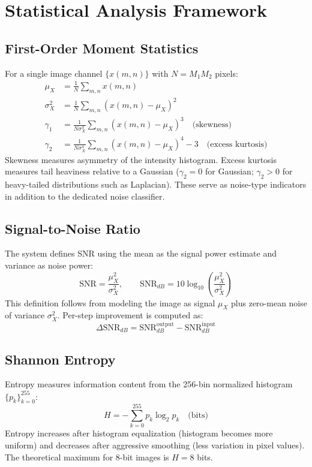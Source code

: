 \documentclass[10pt,conference]{IEEEtran}
\begin{document}
\section{Statistical Analysis Framework}

\subsection{First-Order Moment Statistics}
For a single image channel $\{x(m,n)\}$ with $N = M_1 M_2$ pixels:
\begin{align}
\mu_X &= \frac{1}{N}\sum_{m,n} x(m,n) \\
\sigma_X^2 &= \frac{1}{N}\sum_{m,n}(x(m,n)-\mu_X)^2 \\
\gamma_1 &= \frac{1}{N\sigma_X^3}\sum_{m,n}(x(m,n)-\mu_X)^3 \quad\text{(skewness)}\\
\gamma_2 &= \frac{1}{N\sigma_X^4}\sum_{m,n}(x(m,n)-\mu_X)^4 - 3 \quad\text{(excess kurtosis)}
\end{align}
Skewness measures asymmetry of the intensity histogram. Excess kurtosis measures tail heaviness relative to a Gaussian ($\gamma_2=0$ for Gaussian; $\gamma_2 > 0$ for heavy-tailed distributions such as Laplacian). These serve as noise-type indicators in addition to the dedicated noise classifier.

\subsection{Signal-to-Noise Ratio}
The system defines SNR using the mean as the signal power estimate and variance as noise power:
\begin{equation}
\text{SNR} = \frac{\mu_X^2}{\sigma_X^2}, \qquad \text{SNR}_{dB} = 10\log_{10}\!\left(\frac{\mu_X^2}{\sigma_X^2}\right)
\end{equation}
This definition follows from modeling the image as signal $\mu_X$ plus zero-mean noise of variance $\sigma_X^2$. Per-step improvement is computed as:
\begin{equation}
\Delta\text{SNR}_{dB} = \text{SNR}_{dB}^{\text{output}} - \text{SNR}_{dB}^{\text{input}}
\end{equation}

\subsection{Shannon Entropy}
Entropy measures information content from the 256-bin normalized histogram $\{p_k\}_{k=0}^{255}$:
\begin{equation}
H = -\sum_{k=0}^{255} p_k \log_2 p_k \quad \text{(bits)}
\end{equation}
Entropy increases after histogram equalization (histogram becomes more uniform) and decreases after aggressive smoothing (less variation in pixel values). The theoretical maximum for 8-bit images is $H=8$ bits.
\end{document}
